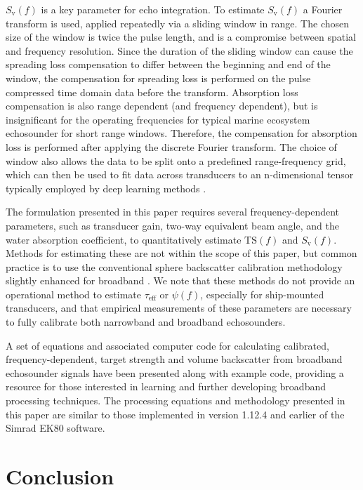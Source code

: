 \documentclass[preprint,12pt,TurnOnLineNumbers]{JASAnew}
\newcommand{\ek}{Simrad EK80}
\newcommand{\freqsym}{f}
\newcommand{\teff}{\tau_{\textrm{eff}}}
\newcommand{\ts}{\textrm{TS}}
\newcommand{\sv}{S_{\textrm{v}}}
\newcommand{\eqang}{\psi}
\begin{document}
$\sv(\freqsym)$ is a key parameter for echo integration. To estimate $\sv(\freqsym)$ a Fourier transform is used, applied repeatedly via a sliding window in range. The chosen size of the window is twice the pulse length, and is a compromise between spatial and frequency resolution. Since the duration of the sliding window can cause the spreading loss compensation to differ between the beginning and end of the window, the compensation for spreading loss is performed on the pulse compressed time domain data before the transform. Absorption loss compensation is also range dependent (and frequency dependent), but is insignificant for the operating frequencies for typical marine ecosystem echosounder for short range windows. Therefore, the compensation for absorption loss is performed after applying the discrete Fourier transform. The choice of window also allows the data to be split onto a predefined range-frequency grid, which can then be used to fit data across transducers to an n-dimensional tensor typically employed by deep learning methods \citep[e.g.]{brautaset_acoustic_2020}.

The formulation presented in this paper requires several frequency-dependent parameters, such as transducer gain, two-way equivalent beam angle, and the water absorption coefficient, to quantitatively estimate $\ts(\freqsym)$ and $\sv(\freqsym)$. Methods for estimating these are not within the scope of this paper, but common practice is to use the conventional sphere backscatter calibration methodology \citep{demerCalibrationAcousticInstruments2015} slightly enhanced for broadband \citep{hobaekCharacterizationTargetSpheres2013,lavery2017}. We note that these methods do not provide an operational method to estimate $\teff$ or $\eqang(\freqsym)$, especially for ship-mounted transducers, and that empirical measurements of these parameters are necessary to fully calibrate both narrowband and broadband echosounders.

A set of equations and associated computer code for calculating calibrated, frequency-dependent, target strength and volume backscatter from broadband echosounder signals have been presented along with example code, providing a resource for those interested in learning and further developing broadband processing techniques. The processing equations and methodology presented in this paper are similar to those implemented in version 1.12.4 and earlier of the \ek{} software.


\section{Conclusion}
\end{document}
